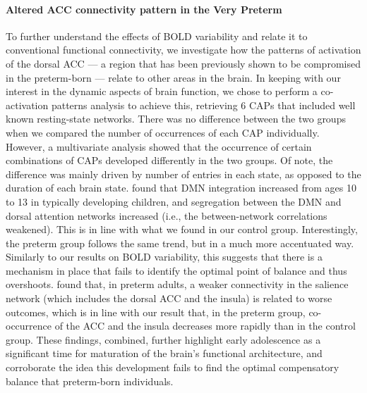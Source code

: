 \paragraph{Altered ACC connectivity pattern in the Very Preterm}
To further understand the effects of BOLD variability and relate it to conventional functional connectivity, we investigate how the patterns of activation of the dorsal ACC --- a region that has been previously shown to be compromised in the preterm-born  \citep{White2014, Daamen2015, Lordier2019} --- relate to other areas in the brain. In keeping with our interest in the dynamic aspects of brain function, we chose to perform a co-activation patterns analysis to achieve this, retrieving 6 CAPs that included well known resting-state networks. There was no difference between the two groups when we compared the number of occurrences of each CAP individually. However, a multivariate analysis showed that the occurrence of certain combinations of CAPs developed differently in the two groups. Of note, the difference was mainly driven by number of entries in each state, as opposed to the duration of each brain state. \cite{Sherman2014} found that DMN integration increased from ages 10 to 13 in typically developing children, and segregation between the DMN and dorsal attention networks increased (i.e., the between-network correlations weakened). This is in line with what we found in our control group. Interestingly, the preterm group follows the same trend, but in a much more accentuated way. Similarly to our results on BOLD variability, this suggests that there is a mechanism in place that fails to identify the optimal point of balance and thus overshoots.  \cite{Nosarti2006} found that, in preterm adults, a weaker connectivity in the salience network (which includes the dorsal ACC and the insula) is related to worse outcomes, which is in line with our result that, in the preterm group, co-occurrence of the ACC and the insula decreases more rapidly than in the control group.  These findings, combined, further highlight early adolescence as a significant time for maturation of the brain's functional architecture, and corroborate the idea this development fails to find the optimal compensatory balance that preterm-born individuals.


